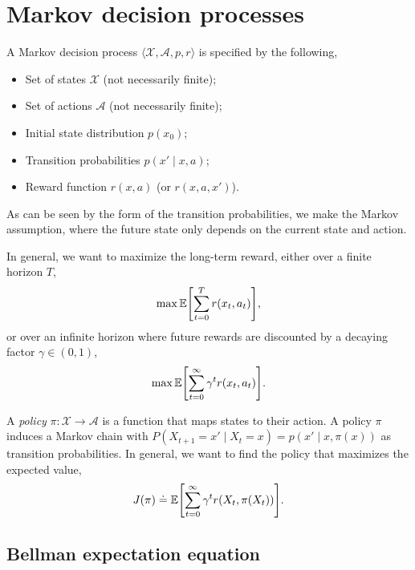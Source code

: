 \section{Markov decision processes} \label{sec:mdp}


\begin{definition}
    A Markov decision process $\langle \mathcal{X},\mathcal{A},p,r \rangle$ is
    specified by the following,
    \begin{itemize}
        \item Set of states $\mathcal{X}$ (not necessarily finite);
        \item Set of actions $\mathcal{A}$ (not necessarily finite);
        \item Initial state distribution $p(x_0)$;
        \item Transition probabilities $p(x'\mid x, a)$;
        \item Reward function $r(x, a)$ (or $r(x,a,x')$).
    \end{itemize}
    As can be seen by the form of the transition probabilities, we make the
    Markov assumption, where the future state only depends on the current state
    and action.
\end{definition}

In general, we want to maximize the long-term reward, either over a finite
horizon $T$, \[
    \max \E \lft[ \sum_{t=0}^T r(x_t,a_t) \rgt],
\]
or over an infinite horizon where future rewards are discounted by a decaying
factor $\gamma\in(0,1)$, \[
    \max \E \lft[ \sum_{t=0}^{\infty} \gamma^t r(x_t,a_t) \rgt].
\]

A \textit{policy} $\pi : \mathcal{X} \to \mathcal{A}$ is a function that maps
states to their action. A policy $\pi$ induces a Markov chain with
$P(X_{t+1}=x' \mid X_t = x) = p(x' \mid x, \pi(x))$ as transition
probabilities. In general, we want to find the policy that maximizes the
expected value, \[
    J(\pi) \doteq \E \lft[ \sum_{t=0}^\infty \gamma^t r(X_t, \pi(X_t)) \rgt].
\]

\subsection{Bellman expectation equation}

